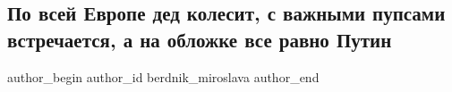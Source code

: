  
 
 
 
 
 
\subsection{По всей Европе дед колесит, с важными пупсами встречается, а на обложке все равно Путин}
\label{sec:12_06_2021.fb.berdnik_miroslava.1.putin_biden_joe_zhurnal_time}
\ifcmt
 author_begin
   author_id berdnik_miroslava
 author_end
\fi
